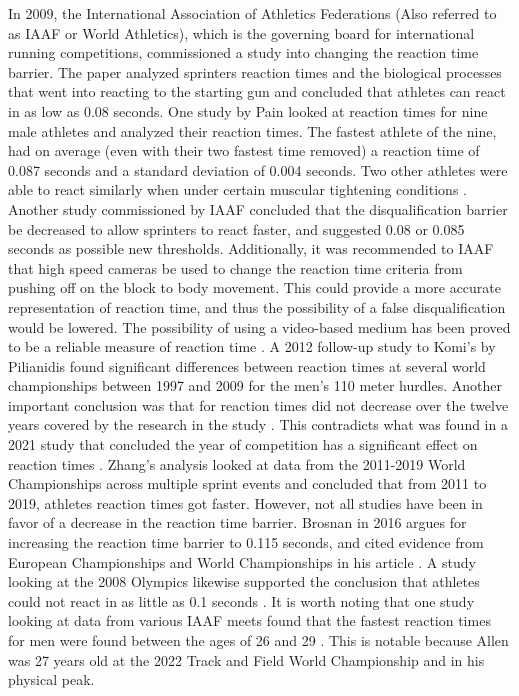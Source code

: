 \documentclass[12pt, letterpaper, titlepage]{article}
\begin{document}
In 2009, the International Association of Athletics Federations (Also referred to
as IAAF or World Athletics), which is the governing board for international running
competitions, commissioned a study into changing the reaction time barrier.
The paper analyzed sprinters reaction times and the biological processes 
that went into reacting to the starting gun and concluded 
that athletes can react in as low as 0.08 seconds.  One study by Pain looked at
reaction times for nine male athletes and analyzed their reaction times.  The
fastest athlete of the nine, had on average (even with their two fastest time 
removed) a reaction time of 0.087 seconds and a standard deviation of 0.004
seconds.  Two other athletes were able to react similarly when under certain
muscular tightening conditions \citep{pain2007sprint}. Another study commissioned
by IAAF concluded that the disqualification barrier be decreased to allow sprinters to
react faster, and suggested 0.08 or 0.085 seconds as possible new thresholds.
Additionally, it was recommended to IAAF that high speed cameras be used to
change the reaction time criteria from pushing off on the block to body movement.
\citep{komi2009iaaf} This could provide a more accurate representation of 
reaction time, and thus the possibility of a false disqualification would be lowered.
The possibility of using a video-based medium has been proved to be a reliable
measure of reaction time \citep{mudric2015evaluation}.
A 2012 follow-up study to Komi's by Pilianidis found
significant differences between reaction times at several world championships
between 1997 and 2009 for the men's 110 meter hurdles.  Another important
conclusion was that for reaction times did not decrease over the twelve years
covered by the research in the study \citep{pilianidis2012start}.  This contradicts
what was found in a 2021 study that concluded the year of competition has a
significant effect on reaction times \citep{zhang2021correlation}.  Zhang's
analysis looked at data from the 2011-2019 World Championships across multiple
sprint events and concluded that from 2011 to 2019, athletes reaction times got
faster. However, not  all studies have been in favor of a decrease in the
reaction time barrier. Brosnan in 2016 argues for increasing the reaction time 
barrier to 0.115 seconds, and cited evidence from European Championships and 
World Championships in his article \citep{brosnan2017effects}.  A study looking 
at the 2008 Olympics likewise supported the conclusion that athletes could not
 react in as little as 0.1 seconds \citep{lipps2011implications}.
It is worth noting that one study looking at data from various IAAF meets found
that the fastest reaction times for men were found between the ages of 26 and 29
\citep{tonnessen2013reaction}.  This is notable because Allen was 27 years old
at the 2022 Track and Field World Championship and in his physical peak.
\end{document}
